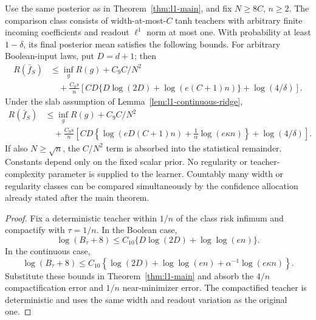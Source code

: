 \begin{corollary}
\label{cor:l1-coefficient-free}
Use the same posterior as in Theorem~\ref{thm:l1-main}, and fix
$N\ge8C$, $n\ge2$. The comparison class consists of
width-at-most-$C$ tanh teachers with arbitrary finite incoming
coefficients and readout $\ell^1$ norm at most one. With probability at least
$1-\delta$, its final posterior mean satisfies the following bounds.
For arbitrary Boolean-input laws, put $D=d+1$; then
\[
 \begin{aligned}
 R(\bar f_S)&\le\inf_gR(g)+C_9C/N^2\\
 &\quad+\frac{C_9s}{n}
 \left[CD\{D\log(2D)+\log(e(C+1)n)\}
                   +\log(4/\delta)\right].
 \end{aligned}
\]
Under the slab assumption of Lemma~\ref{lem:l1-continuous-ridge},
\[
 \begin{aligned}
 R(\bar f_S)&\le\inf_gR(g)+C_9C/N^2\\
 &\quad+\frac{C_9s}{n}
 \left[CD\left\{\log(eD(C+1)n)
               +\frac1\alpha\log(e\kappa n)\right\}
                    +\log(4/\delta)\right].
 \end{aligned}
\]
If also $N\ge\sqrt n$, the $C/N^2$ term is absorbed into the statistical
remainder. Constants depend only on the fixed scalar prior. No regularity or
teacher-complexity parameter is supplied to the learner. Countably
many width or regularity classes can be compared simultaneously by
the confidence allocation already stated after the main theorem.
\end{corollary}
\begin{proof}
Fix a deterministic teacher within $1/n$ of the class risk infimum
and compactify with $\tau=1/n$. In the Boolean case,
\[
 \log(B_\tau+8)\le C_{10}\{D\log(2D)+\log\log(en)\}.
\]
In the continuous case,
\[
 \log(B_\tau+8)\le C_{10}\left\{\log(2D)+\log\log(en)
                                 +\alpha^{-1}\log(e\kappa n)\right\}.
\]
Substitute these bounds in Theorem~\ref{thm:l1-main} and absorb the
$4/n$ compactification error and $1/n$ near-minimizer error. The
compactified teacher is deterministic and uses the same width and
readout variation as the original one.
\end{proof}
